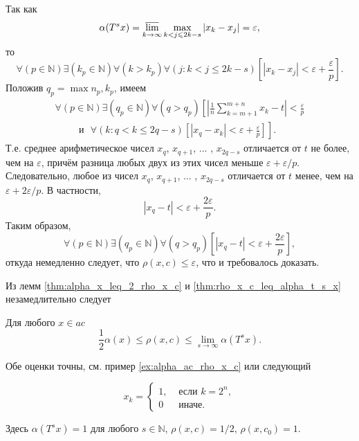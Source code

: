 Так как
\begin{equation}
	\alpha(T^s x) = \varlimsup_{k\to\infty} \max_{k<j\leq 2k-s} |x_k-x_j| = \varepsilon
	,
\end{equation}
то
\begin{equation}
	\forall(p\in\mathbb{N})
	\exists(k_p \in\mathbb{N})\forall(k>k_p)
	\forall(j: k< j \leq 2k-s)
	\left[
		|x_k - x_j|<\varepsilon + \frac{\varepsilon}{p}
	\right]
	.
\end{equation}
Положив $q_p = \max{n_p, k_p}$, имеем
\begin{multline}
	\forall(p\in\mathbb{N})
	\exists(q_p \in\mathbb{N})
	\forall(q>q_p)
	\left[
		\left|
			\frac{1}{n}\sum_{k=m+1}^{m+n} x_k
			-t
		\right|
		<\frac{\varepsilon}{p}
		\right.\\ \left. \phantom{\sum_0^0}
		\mbox{~~и~~}
		\forall(k:q<k \leq 2q-s)
		\left[
			|x_q - x_k|<\varepsilon + \frac{\varepsilon}{p}
		\right]
	\right]
	.
\end{multline}
Т.е. среднее арифметическое чисел $x_q$, $x_{q+1}$, ... , $x_{2q-s}$ отличается от $t$
не более, чем на $\varepsilon$, причём разница любых двух из этих чисел меньше $\varepsilon + \varepsilon/p$.
Следовательно, любое из чисел $x_q$, $x_{q+1}$, ... , $x_{2q-s}$
отличается от $t$ менее, чем на $\varepsilon + 2\varepsilon/p$.
В частности,
\begin{equation}
	|x_q - t| < \varepsilon + \frac{2\varepsilon}{p}
	.
\end{equation}
Таким образом,
\begin{equation}
	\forall(p\in\mathbb{N})
	\exists(q_p \in\mathbb{N})
	\forall(q>q_p)
	\left[
		|x_q - t| < \varepsilon + \frac{2\varepsilon}{p}
	\right]
	,
\end{equation}
откуда немедленно следует, что $\rho(x,c) \leq \varepsilon$,
что и требовалось доказать.

Из лемм \ref{thm:alpha_x_leq_2_rho_x_c} и \ref{thm:rho_x_c_leq_alpha_t_s_x}
незамедлительно следует
\begin{theorem}
\label{thm:rho_x_c_leq_alpha_t_s_x}
	Для любого $x\in ac$
	\begin{equation}
		\frac{1}{2} \alpha(x) \leq \rho(x,c)\leq \lim_{s\to\infty} \alpha(T^s x)
		.
	\end{equation}
\end{theorem}

Обе оценки точны, см. пример \ref{ex:alpha_ac_rho_x_c} или следующий
\begin{example}
	\begin{equation}
		x_k = \begin{cases}
			1, &\mbox{~если~} k = 2^n,
			\\
			0 &\mbox{~иначе.}
		\end{cases}
	\end{equation}
\end{example}
Здесь $\alpha(T^s x) = 1$ для любого $s\in\mathbb{N}$, $\rho(x,c) = 1/2$, $\rho(x, c_0) = 1$.
